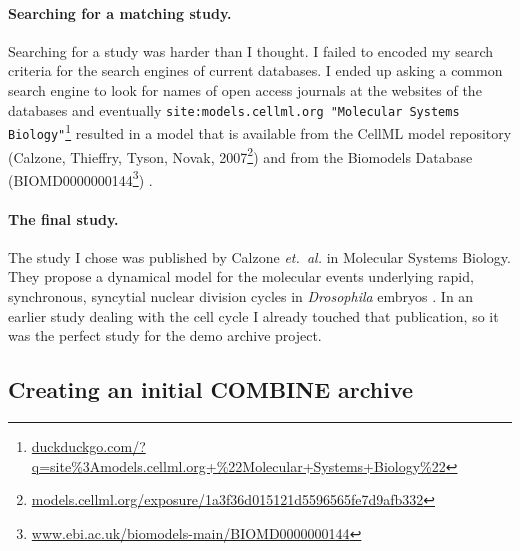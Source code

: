 \paragraph{Searching for a matching study.}
Searching for a study was harder than I thought.
I failed to encoded my search criteria for the search engines of current databases.
I ended up asking a common search engine to look for names of open access journals at the websites of the databases and eventually \texttt{site:models.cellml.org "Molecular Systems Biology"}\footnote{\href{https://duckduckgo.com/?q=site\%3Amodels.cellml.org+\%22Molecular+Systems+Biology\%22}{duckduckgo.com/?q=site\%3Amodels.cellml.org+\%22Molecular+Systems+Biology\%22}} resulted in a model that is available from the CellML model repository (Calzone, Thieffry, Tyson, Novak, 2007\footnote{\href{http://models.cellml.org/exposure/1a3f36d015121d5596565fe7d9afb332}{models.cellml.org/exposure/1a3f36d015121d5596565fe7d9afb332}}) \cite{cellmlrepo} and from the Biomodels Database (BIOMD0000000144\footnote{\href{http://www.ebi.ac.uk/biomodels-main/BIOMD0000000144}{www.ebi.ac.uk/biomodels-main/BIOMD0000000144}}) \cite{biomodels}.


\paragraph{The final study.}
The study I chose was published by Calzone \emph{et.~al.} in Molecular Systems Biology. They propose a dynamical model for the molecular events underlying rapid, synchronous, syncytial nuclear division cycles in \textit{Drosophila} embryos \cite{Calzone2007}.
In an earlier study dealing with the cell cycle I already touched that publication, so it was the perfect study for the demo archive project.




\subsection{Creating an initial COMBINE archive}

